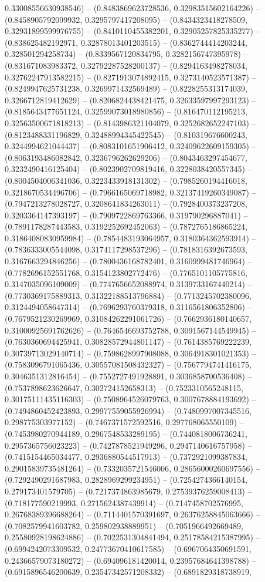 0.33008556630938546) -- (0.8483869623728536, 0.32983515602164226) -- (0.8458905792099932, 0.3295797417208095) -- (0.8434323418278509, 0.32931899599976755) -- (0.8410110455382201, 0.32905257825335277) -- (0.838625482192971, 0.32878013401203515) -- (0.8362744414203244, 0.328501294258734) -- (0.8339567120834795, 0.3282156747395978) -- (0.831671083983372, 0.32792287528200137) -- (0.8294163498278034, 0.32762247913582215) -- (0.8271913074892415, 0.3273140523571387) -- (0.8249947625731238, 0.3269971432569489) -- (0.8228255313174039, 0.3266712819412629) -- (0.8206824438421475, 0.32633597997293123) -- (0.8185643477651124, 0.32599073018980856) -- (0.816470112195213, 0.32563500671818213) -- (0.8143986321104079, 0.3252682652247103) -- (0.8123488331196829, 0.32488994345422545) -- (0.810319676600243, 0.3244994621044437) -- (0.8083101651906412, 0.32409622609159305) -- (0.8063193486082842, 0.3236796262629206) -- (0.8043463297454677, 0.3232490416125404) -- (0.8023902709819416, 0.3228038420557345) -- (0.8004504006341036, 0.3223433918131302) -- (0.7985260194416018, 0.3218670534496706) -- (0.7966165069718982, 0.32137419260349087) -- (0.7947213278028727, 0.3208641834263011) -- (0.7928400373237208, 0.3203364147393197) -- (0.7909722869763366, 0.319790296887041) -- (0.7891178287443583, 0.3192252692452063) -- (0.7872765186865224, 0.31864080830959984) -- (0.7854483193064957, 0.3180364362593914) -- (0.7836333005544098, 0.3174117298537296) -- (0.7818316392673593, 0.3167663294846256) -- (0.7800436168782401, 0.3160999481746964) -- (0.7782696152551768, 0.3154123802772476) -- (0.7765101105775816, 0.3147035096109009) -- (0.7747656652088974, 0.3139733167440214) -- (0.7730369175889313, 0.31322188513796884) -- (0.7713245702380096, 0.3124494058647314) -- (0.7696293760379318, 0.3116561806352806) -- (0.7679521230269969, 0.31084262291061726) -- (0.7662936180140657, 0.31000925691762626) -- (0.7646546693752788, 0.3091567144549945) -- (0.7630360694425941, 0.30828572944801147) -- (0.7614385769222239, 0.30739713029140714) -- (0.7598628997908088, 0.3064918301021353) -- (0.7583096791065436, 0.30557081508432327) -- (0.7567794741416175, 0.3046351312816454) -- (0.7552727491928891, 0.3036858700536408) -- (0.7537898623626647, 0.302724152658313) -- (0.7523310565248115, 0.30175111435116303) -- (0.7508964526079763, 0.3007678884193692) -- (0.7494860452423893, 0.29977559055926994) -- (0.7480997007345516, 0.298775303977152) -- (0.7467371572592516, 0.297768065550109) -- (0.7453980270944189, 0.2967548533289195) -- (0.7440818006736241, 0.2957365756023223) -- (0.7427878521949296, 0.2947140616757958) -- (0.7415154465034477, 0.2936880544517913) -- (0.7372921099387834, 0.29015839735481264) -- (0.7332035721546006, 0.28656000260697556) -- (0.7292490291687983, 0.2828969299234951) -- (0.7254274366140154, 0.279173401579705) -- (0.7217374863985679, 0.27539376259008413) -- (0.718177590219993, 0.2715624387439914) -- (0.7147458702576995, 0.26768389396688264) -- (0.7114401570391697, 0.26376258845063666) -- (0.7082579941603782, 0.259802938889951) -- (0.7051966492669489, 0.25580928198624886) -- (0.7022531304841494, 0.25178584215387995) -- (0.6994242073309532, 0.24773670410617585) -- (0.6967064350691591, 0.24366579073180272) -- (0.694096181420014, 0.23957684641398788) -- (0.6915896546200639, 0.23547342571208332) -- (0.6891829318738919, 